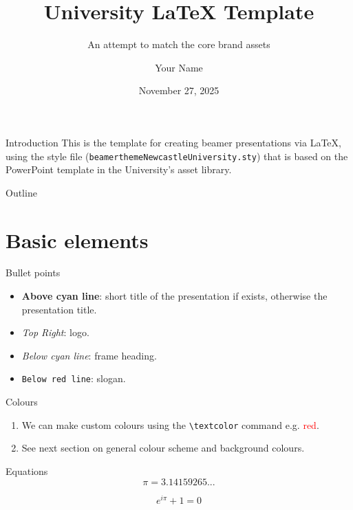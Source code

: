 \documentclass[aspectratio=169]{beamer}
\title[Template short title]{University LaTeX Template}
\subtitle{An attempt to match the core brand assets}
\author{Your Name}
\date{November 27, 2025}
\begin{document}
\begin{frame}
  \titlepage
\end{frame}

\begin{frame}{Introduction}
  This is the template for creating beamer presentations via \LaTeX, using the style file (\texttt{beamerthemeNewcastleUniversity.sty}) that is based on the PowerPoint template in the University's asset library.
\end{frame}

\begin{frame}{Outline}
  \tableofcontents
\end{frame}

\section{Basic elements}
\begin{frame}{Bullet points}
  \begin{itemize}
  \item \textbf{Above cyan line}: short title of the presentation if exists, otherwise the presentation title.
  \item \textit{Top Right}: logo.
  \item \emph{Below cyan line}: frame heading.
  \item \texttt{Below red line}: slogan.
  \end{itemize}
\end{frame}

\begin{frame}{Colours}

  \begin{enumerate}
  \item We can make custom colours using the \texttt{\textbackslash{}textcolor} command e.g. \textcolor{red}{red}.
  \item See next section on general colour scheme and background colours.
  \end{enumerate}

\end{frame}

\begin{frame}{Equations}
  $$\pi=3.14159265...$$

  \begin{equation}
    e^{i\pi}+1=0
  \end{equation}
  
\end{frame}
\end{document}

